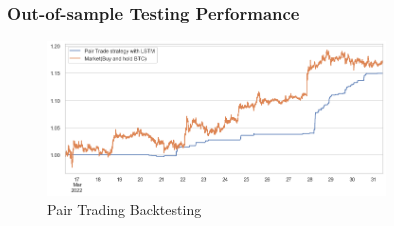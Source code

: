 \documentclass[11pt,a4paper]{article}
\begin{document}
    \subsubsection{Out-of-sample Testing Performance}
    \begin{figure}[H]
        \centering
        \includegraphics[width = 0.8\textwidth]{crypto/plot/backtest.png}
        \caption{Pair Trading Backtesting}
        \label{fig:crypto_backtest}
    \end{figure}
    
\end{document}
